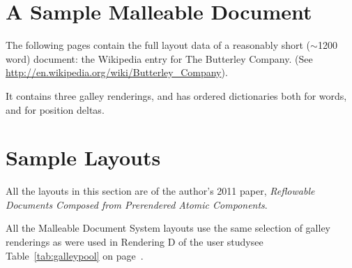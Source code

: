 

%


\cleardoublepage
\chapter{A Sample Malleable Document}
\label{app:sampledoc}

The following pages contain the full layout data of a reasonably short ($\sim$1200 word) document: the Wikipedia entry for The Butterley Company. (See \url{http://en.wikipedia.org/wiki/Butterley_Company}).

It contains three galley renderings, and has ordered dictionaries both for words, and for position deltas.

\newpage




\cleardoublepage
\chapter{Sample Layouts}
\label{app:layouts}

All the layouts in this section are of the author's 2011 paper, \emph{Reflowable Documents Composed from Prerendered Atomic Components}.\cite{Pinkney2011}

All the Malleable Document System layouts use the same selection of galley renderings as were used in Rendering D of the user study\ed see Table~\ref{tab:galleypool} on page~\pageref{tab:galleypool}.


